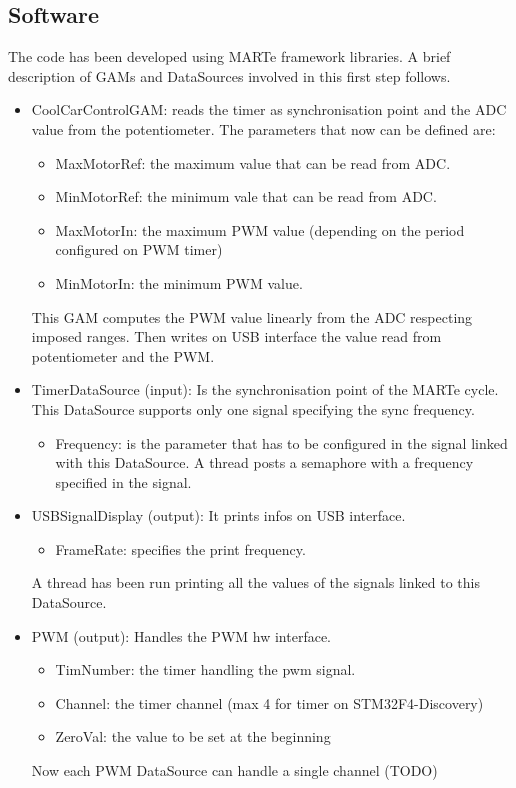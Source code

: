 \subsection{Software}
   The code has been developed using MARTe framework libraries. A brief description of GAMs and DataSources involved in this first step follows.
   \begin{itemize}
	\item CoolCarControlGAM: reads the timer as synchronisation point and the ADC value from the potentiometer. The parameters that now can be defined are:
		\begin{itemize}
          \item MaxMotorRef: the maximum value that can be read from ADC.
          \item MinMotorRef: the minimum vale that can be read from ADC.
          \item MaxMotorIn: the maximum PWM value (depending on the period configured on PWM timer)
          \item MinMotorIn: the minimum PWM value.
        \end{itemize}
        This GAM computes the PWM value linearly from the ADC respecting imposed ranges. Then writes on USB interface the value read from potentiometer and the PWM.     

    \item TimerDataSource (input): Is the synchronisation point of the MARTe cycle. This DataSource supports only one signal specifying the sync frequency.
    	\begin{itemize}
	    \item Frequency: is the parameter that has to be configured in the signal linked with this DataSource.
        A thread posts a semaphore with a frequency specified in the signal.
        \end{itemize}

	\item USBSignalDisplay (output): It prints infos on USB interface.
		\begin{itemize}
          \item FrameRate: specifies the print frequency.
        \end{itemize}
	A thread has been run printing all the values of the signals linked to this DataSource.

	\item PWM (output): Handles the PWM hw interface.
	      \begin{itemize}
          \item TimNumber: the timer handling the pwm signal.
          \item Channel: the timer channel (max 4 for timer on STM32F4-Discovery)
          \item ZeroVal: the value to be set at the beginning
          \end{itemize}
        Now each PWM DataSource can handle a single channel (TODO)


\end{itemize}
